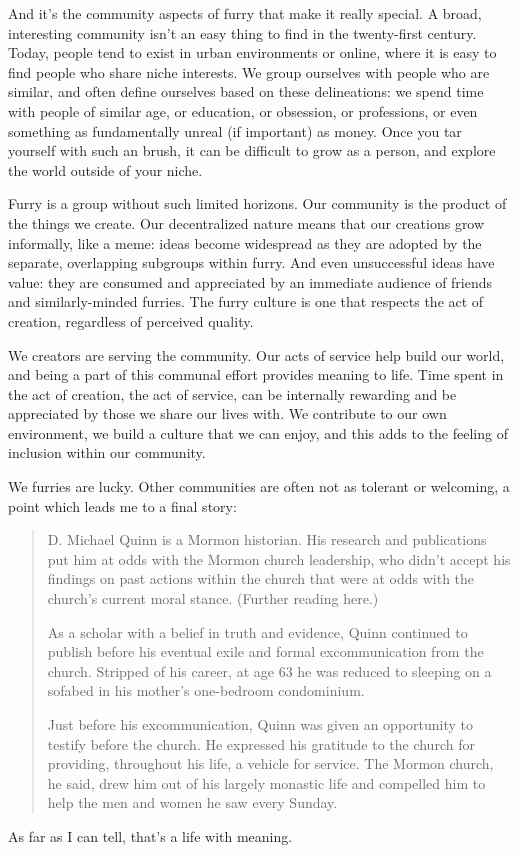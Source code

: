 And it's the community aspects of furry that make it really special. A broad, interesting community isn't an easy thing to find in the twenty-first century. Today, people tend to exist in urban environments or online, where it is easy to find people who share niche interests. We group ourselves with people who are similar, and often define ourselves based on these delineations: we spend time with people of similar age, or education, or obsession, or professions, or even something as fundamentally unreal (if important) as money. Once you tar yourself with such an brush, it can be difficult to grow as a person, and explore the world outside of your niche.

Furry is a group without such limited horizons. Our community is the product of the things we create. Our decentralized nature means that our creations grow informally, like a meme: ideas become widespread as they are adopted by the separate, overlapping subgroups within furry. And even unsuccessful ideas have value: they are consumed and appreciated by an immediate audience of friends and similarly-minded furries. The furry culture is one that respects the act of creation, regardless of perceived quality.

We creators are serving the community. Our acts of service help build our world, and being a part of this communal effort provides meaning to life. Time spent in the act of creation, the act of service, can be internally rewarding and be appreciated by those we share our lives with. We contribute to our own environment, we build a culture that we can enjoy, and this adds to the feeling of inclusion within our community.

We furries are lucky. Other communities are often not as tolerant or welcoming, a point which leads me to a final story:

\begin{quotation}
  D. Michael Quinn is a Mormon historian. His research and publications put him at odds with the Mormon church leadership, who didn't accept his findings on past actions within the church that were at odds with the church's current moral stance. (Further reading here.)

  As a scholar with a belief in truth and evidence, Quinn continued to publish before his eventual exile and formal excommunication from the church. Stripped of his career, at age 63 he was reduced to sleeping on a sofabed in his mother's one-bedroom condominium.

  Just before his excommunication, Quinn was given an opportunity to testify before the church. He expressed his gratitude to the church for providing, throughout his life, a vehicle for service. The Mormon church, he said, drew him out of his largely monastic life and compelled him to help the men and women he saw every Sunday.
\end{quotation}

As far as I can tell, that's a life with meaning.
